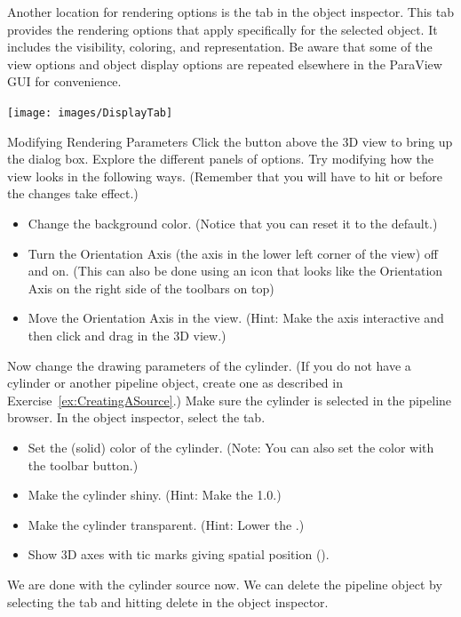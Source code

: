 Another location for rendering options is the  tab in the
object inspector.  This tab provides the rendering options that apply
specifically for the selected object.  It includes the visibility,
coloring, and representation.  Be aware that some of the view options and
object display options are repeated elsewhere in the ParaView GUI for
convenience.

\begin{inlinefig}
  \texttt{[image: images/DisplayTab]}
\end{inlinefig}

\begin{exercise}{Modifying Rendering Parameters}
  \label{ex:ModifyingRenderingParameters}%
  Click the  button above the 3D view to bring up the
   dialog box.  Explore the different panels of
  options.  Try modifying how the view looks in the following ways.
  (Remember that you will have to hit  or  before the
  changes take effect.)

  \begin{itemize}
  \item {} Change the background color.  (Notice that
    you can reset it to the default.)
  \item {} Turn the Orientation Axis (the axis in the
    lower left corner of the view) off and on.  (This can also be done
    using an icon that looks like the Orientation Axis on the right side of
    the toolbars on top)
  \item Move the Orientation Axis in the view.  (Hint: Make the axis
    interactive and then click and drag in the 3D view.)
  \end{itemize}

  Now change the drawing parameters of the cylinder.  (If you do not have a
  cylinder or another pipeline object, create one as described in
  Exercise~\ref{ex:CreatingASource}.)  Make sure the cylinder is selected
  in the pipeline browser.  In the object inspector, select the
   tab.

  \begin{itemize}
  \item {}  Set the (solid) color of
    the cylinder.  (Note: You can also set the color with the
     toolbar button.)
  \item {}  Make the cylinder shiny.
    (Hint: Make the  1.0.)
  \item {}  Make the cylinder transparent.
    (Hint: Lower the .)
  \item {}  Show 3D axes
    with tic marks giving spatial position ().
  \end{itemize}

  We are done with the cylinder source now.  We can delete the pipeline
  object by selecting the  tab and hitting
   delete \delete in the object inspector.
\end{exercise}

